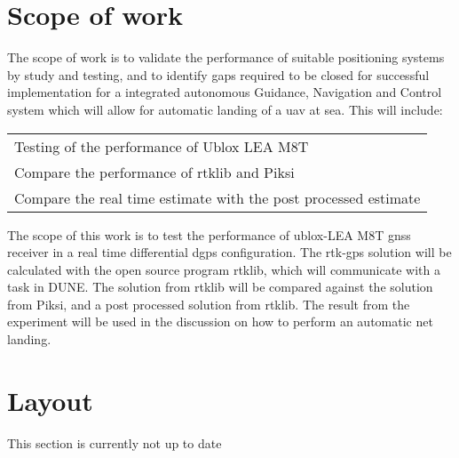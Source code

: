 \section{Scope of work}
The scope of work is to validate the performance of suitable positioning systems by study and testing, and to identify gaps required to be closed for successful implementation for a integrated autonomous Guidance, Navigation and Control system which will allow for automatic landing of a \gls{uav} at sea. This will include:
\begin{table}[!h]
\begin{center}
    \begin{tabular}{ l}
     Testing of the performance of Ublox LEA M8T  \\ 
     Compare the performance of \gls{rtklib} and Piksi \\
     Compare the real time estimate with the post processed estimate 
    \end{tabular}
\end{center}
\label{Tb:Evasion}
\end{table}
The scope of this work is to test the performance of ublox-LEA M8T \gls{gnss} receiver in a real time differential \gls{dgps} configuration. The \gls{rtk-gps} solution will be calculated with the open source program \gls{rtklib}, which will communicate with a task in DUNE. The solution from \gls{rtklib} will be compared against the solution from Piksi, and a post processed solution from \gls{rtklib}. The result from the experiment will be used in the discussion on how to perform an automatic net landing.


\section{Layout}
This section is currently not up to date

